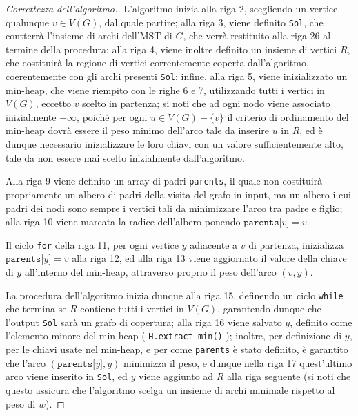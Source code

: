 \documentclass[a4paper, 12pt]{report}
\begin{document}
    \begin{proof}[Correttezza dell'algoritmo.]
        L'algoritmo inizia alla riga 2, scegliendo un vertice qualunque $v \in V(G)$, dal quale partire; alla riga 3, viene definito \texttt{Sol}, che contterrà l'insieme di archi dell'MST di $G$, che verrà restituito alla riga 26 al termine della procedura; alla riga 4, viene inoltre definito un insieme di vertici $R$, che costituirà la regione di vertici correntemente coperta dall'algoritmo, coerentemente con gli archi presenti \texttt{Sol}; infine, alla riga 5, viene inizializzato un min-heap, che viene riempito con le righe 6 e 7, utilizzando tutti i vertici in $V(G)$, eccetto $v$ scelto in partenza; si noti che ad ogni nodo viene associato inizialmente $+ \infty$, poiché per ogni $u \in V(G) - \{v\}$ il criterio di ordinamento del min-heap dovrà essere il peso minimo dell'arco tale da inserire $u$ in $R$, ed è dunque necessario inizializzare le loro chiavi con un valore sufficientemente alto, tale da non essere mai scelto inizialmente dall'algoritmo.

        Alla riga 9 viene definito un array di padri \texttt{parents}, il quale non costituirà propriamente un albero di padri della visita del grafo in input, ma un albero i cui padri dei nodi sono sempre i vertici tali da minimizzare l'arco tra padre e figlio; alla riga 10 viene marcata la radice dell'albero ponendo $\texttt{parents[}v\texttt{]} = v$.

        Il ciclo \texttt{for} della riga 11, per ogni vertice $y$ adiacente a $v$ di partenza, inizializza $\texttt{parents[}y\texttt{]} = v$ alla riga 12, ed alla riga 13 viene aggiornato il valore della chiave di $y$ all'interno del min-heap, attraverso proprio il peso dell'arco $(v, y)$.

        La procedura dell'algoritmo inizia dunque alla riga 15, definendo un ciclo \texttt{while} che termina se $R$ contiene tutti i vertici in $V(G)$, garantendo dunque che l'output \texttt{Sol} sarà un grafo di copertura; alla riga 16 viene salvato $y$, definito come l'elemento minore del min-heap ( \texttt{H.extract\_min()} ); inoltre, per definizione di $y$, per le chiavi usate nel min-heap, e per come \texttt{parents} è stato definito, è garantito che l'arco $(\texttt{parents[}y\texttt{]}, y)$ minimizza il peso, e dunque nella riga 17 quest'ultimo arco viene inserito in \texttt{Sol}, ed $y$ viene aggiunto ad $R$ alla riga seguente (si noti che questo assicura che l'algoritmo scelga un insieme di archi minimale rispetto al peso di $w$).


\end{proof}
\end{document}
